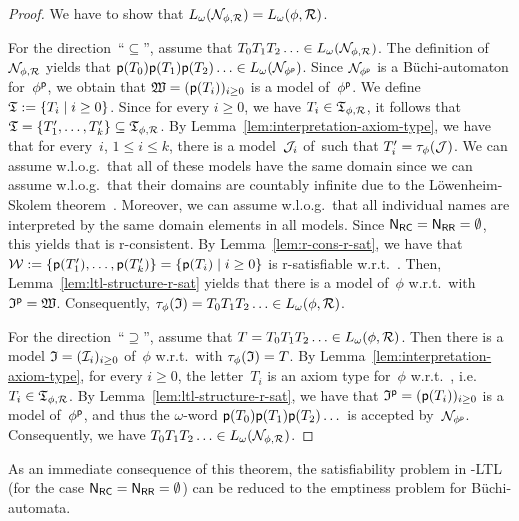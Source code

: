 \begin{proof}
    We have to show that $L_\omega(\mathcal{N}_{\phi,\mathcal{R}})=L_\omega(\phi,\mathcal{R})$.

    For the direction~\enquote{$\subseteq$}, assume that
    $T_0T_1T_2\dotso\in L_\omega(\mathcal{N}_{\phi,\mathcal{R}})$.  The definition
    of~$\mathcal{N}_{\phi,\mathcal{R}}$ yields that
    $\mathsf{p}(T_0)\mathsf{p}(T_1)\mathsf{p}(T_2)\dotso\in L_\omega(\mathcal{N}_{\phi^\mathsf{p}})$.  Since
    $\mathcal{N}_{\phi^\mathsf{p}}$ is a Büchi-automaton for~$\phi^\mathsf{p}$, we obtain that
    $\mathfrak{W}=(\mathsf{p}(T_i))_{i\ge 0}$ is a model of~$\phi^\mathsf{p}$.
    We define $\mathfrak{T}:=\{T_i\mid i\ge 0\}$.  Since for every $i\ge 0$, we have
    $T_i\in\mathfrak{T}_{\phi,\mathcal{R}}$, it follows that
    $\mathfrak{T}=\{T_1',\dots,T_k'\}\subseteq\mathfrak{T}_{\phi,\mathcal{R}}$.  By
    Lemma~\ref{lem:interpretation-axiom-type}, we have that for every~$i$,
    $1\le i\le k$, there is a model~$\mathcal{J}_i$ of~\Rmc such that
    $T_i'=\tau_\phi(\mathcal{J})$.  We can assume w.l.o.g.\ that all of these models
    have the same domain since we can assume w.l.o.g.\ that their domains are
    countably infinite due to the Löwenheim-Skolem
    theorem~\cite{Loe-MA15,Sko-VS20}.  Moreover, we can assume w.l.o.g.\ that
    all individual names are interpreted by the same domain elements in all
    models.  Since $\mathsf{N_{RC}}=\mathsf{N_{RR}}=\emptyset$, this yields that \Tmf is r-consistent.
    By Lemma~\ref{lem:r-cons-r-sat}, we have that
    $\mathcal{W}:=\{\mathsf{p}(T_1'),\dots,\mathsf{p}(T_k')\}=\{\mathsf{p}(T_i)\mid i\ge 0\}$ is
    r-satisfiable w.r.t.~\Rmc.  Then, Lemma~\ref{lem:ltl-structure-r-sat} yields
    that there is a model \Imf of~$\phi$ w.r.t.~\Rmc with $\mathfrak{I}^\mathsf{p}=\mathfrak{W}$.
    Consequently, $\tau_\phi(\mathfrak{I})=T_0T_1T_2\dotso\in L_\omega(\phi,\mathcal{R})$.

    For the direction~\enquote{$\supseteq$}, assume that
    $T=T_0T_1T_2\dotso\in L_\omega(\phi,\mathcal{R})$.  Then there is a model
    $\mathfrak{I}=(\mathcal{I}_i)_{i\ge 0}$ of~$\phi$ w.r.t.~\Rmc with $\tau_\phi(\mathfrak{I})=T$.  By
    Lemma~\ref{lem:interpretation-axiom-type}, for every $i\ge 0$, the
    letter~$T_i$ is an axiom type for~$\phi$ w.r.t.~\Rmc,
    i.e.~$T_i\in\mathfrak{T}_{\phi,\mathcal{R}}$.
    By Lemma~\ref{lem:ltl-structure-r-sat}, we have that
    $\mathfrak{I}^\mathsf{p}=(\mathsf{p}(T_i))_{i\ge 0}$ is a model of~$\phi^\mathsf{p}$, and thus the
    $\omega$-word $\mathsf{p}(T_0)\mathsf{p}(T_1)\mathsf{p}(T_2)\dots$ is accepted
    by~$\mathcal{N}_{\phi^\mathsf{p}}$.  Consequently, we have
    $T_0T_1T_2\dotso\in L_\omega(\mathcal{N}_{\phi,\mathcal{R}})$.
\end{proof}

\noindent
As an immediate consequence of this theorem, the satisfiability problem in
\SHOQ-LTL (for the case $\mathsf{N_{RC}}=\mathsf{N_{RR}}=\emptyset$) can be reduced to the emptiness
problem for Büchi-automata.

